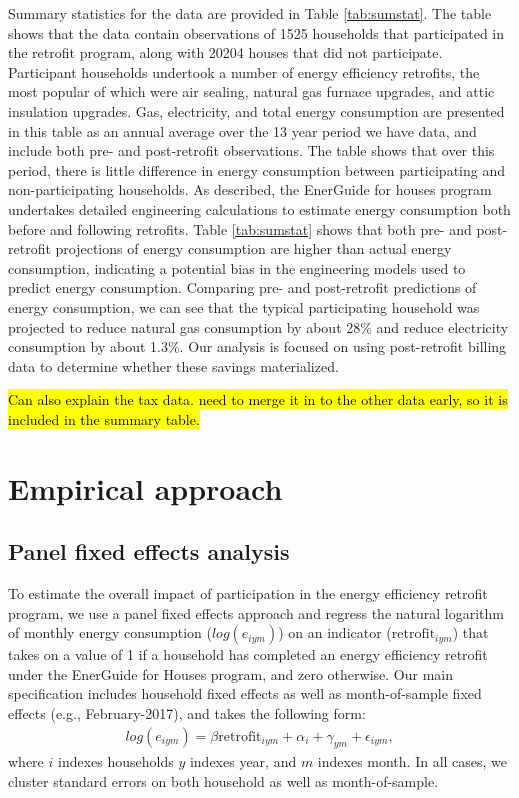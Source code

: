 \documentclass{article}
\newcommand{\hlc}[2][yellow]{ {\sethlcolor{#1} \hl{#2}} }
\begin{document}
Summary statistics for the data are provided in Table \ref{tab:sumstat}. The table shows that the data contain observations of 1525 households that participated in the retrofit program, along with 20204 houses that did not participate.  Participant households undertook a number of energy efficiency retrofits, the most popular of which were air sealing, natural gas furnace upgrades, and attic insulation upgrades.  Gas, electricity, and total energy consumption are presented in this table as an annual average over the 13 year period we have data, and include both pre- and post-retrofit observations. The table shows that over this period, there is little difference in energy consumption between participating and non-participating households. As described, the EnerGuide for houses program undertakes detailed engineering calculations to estimate energy consumption both before and following retrofits. Table \ref{tab:sumstat} shows that both pre- and post-retrofit projections of energy consumption are higher than actual energy consumption, indicating a potential bias in the engineering models used to predict energy consumption. Comparing pre- and post-retrofit predictions of energy consumption, we can see that the typical participating household was projected to reduce natural gas consumption by about 28\% and reduce electricity consumption by about 1.3\%. Our analysis is focused on using post-retrofit billing data to determine whether these savings materialized.



\hlc{Can also explain the tax data.  need to merge it in to the other data early, so it is included in the summary table.}


\section{Empirical approach}

\subsection{Panel fixed effects analysis}
To estimate the overall impact of participation in the energy efficiency retrofit program, we use a panel fixed effects approach and regress the natural logarithm of monthly energy consumption ($log(e_{iym})$) on an indicator ($\text{retrofit}_{iym}$) that takes on a value of 1 if a household has completed an energy efficiency retrofit under the EnerGuide for Houses program, and zero otherwise. Our main specification includes household fixed effects as well as month-of-sample fixed effects (e.g., February-2017), and takes the following form:
\begin{align}
	log(e_{iym}) = \beta \text{retrofit}_{iym} + \alpha_i + \gamma_{ym} + \epsilon_{iym},
	\label{eq:did}
\end{align}
where $i$ indexes households $y$ indexes year, and $m$ indexes month. In all cases, we cluster standard errors on both household as well as month-of-sample.
\end{document}
